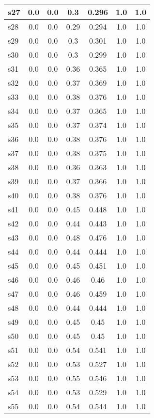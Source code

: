 \documentclass{article}
\begin{document}
\begin{tabular}{|l|c|c|c|c|c|c|}
s27 &0.0 & 0.0 & 0.3 & 0.296 & 1.0 & 1.0\\
\hline
s28 &0.0 & 0.0 & 0.29 & 0.294 & 1.0 & 1.0\\
\hline
s29 &0.0 & 0.0 & 0.3 & 0.301 & 1.0 & 1.0\\
\hline
s30 &0.0 & 0.0 & 0.3 & 0.299 & 1.0 & 1.0\\
\hline
s31 &0.0 & 0.0 & 0.36 & 0.365 & 1.0 & 1.0\\
\hline
s32 &0.0 & 0.0 & 0.37 & 0.369 & 1.0 & 1.0\\
\hline
s33 &0.0 & 0.0 & 0.38 & 0.376 & 1.0 & 1.0\\
\hline
s34 &0.0 & 0.0 & 0.37 & 0.365 & 1.0 & 1.0\\
\hline
s35 &0.0 & 0.0 & 0.37 & 0.374 & 1.0 & 1.0\\
\hline
s36 &0.0 & 0.0 & 0.38 & 0.376 & 1.0 & 1.0\\
\hline
s37 &0.0 & 0.0 & 0.38 & 0.375 & 1.0 & 1.0\\
\hline
s38 &0.0 & 0.0 & 0.36 & 0.363 & 1.0 & 1.0\\
\hline
s39 &0.0 & 0.0 & 0.37 & 0.366 & 1.0 & 1.0\\
\hline
s40 &0.0 & 0.0 & 0.38 & 0.376 & 1.0 & 1.0\\
\hline
s41 &0.0 & 0.0 & 0.45 & 0.448 & 1.0 & 1.0\\
\hline
s42 &0.0 & 0.0 & 0.44 & 0.443 & 1.0 & 1.0\\
\hline
s43 &0.0 & 0.0 & 0.48 & 0.476 & 1.0 & 1.0\\
\hline
s44 &0.0 & 0.0 & 0.44 & 0.444 & 1.0 & 1.0\\
\hline
s45 &0.0 & 0.0 & 0.45 & 0.451 & 1.0 & 1.0\\
\hline
s46 &0.0 & 0.0 & 0.46 & 0.46 & 1.0 & 1.0\\
\hline
s47 &0.0 & 0.0 & 0.46 & 0.459 & 1.0 & 1.0\\
\hline
s48 &0.0 & 0.0 & 0.44 & 0.444 & 1.0 & 1.0\\
\hline
s49 &0.0 & 0.0 & 0.45 & 0.45 & 1.0 & 1.0\\
\hline
s50 &0.0 & 0.0 & 0.45 & 0.45 & 1.0 & 1.0\\
\hline
s51 &0.0 & 0.0 & 0.54 & 0.541 & 1.0 & 1.0\\
\hline
s52 &0.0 & 0.0 & 0.53 & 0.527 & 1.0 & 1.0\\
\hline
s53 &0.0 & 0.0 & 0.55 & 0.546 & 1.0 & 1.0\\
\hline
s54 &0.0 & 0.0 & 0.53 & 0.529 & 1.0 & 1.0\\
\hline
s55 &0.0 & 0.0 & 0.54 & 0.544 & 1.0 & 1.0\\

\end{tabular}
\end{document}
